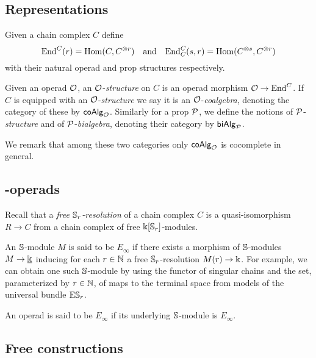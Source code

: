 \subsection{Representations}

Given a chain complex $C$ define
\[
\End^C(r) = \Hom(C, C^{\otimes r})
\quad \text{and} \quad
\End^C_C(s, r) = \Hom(C^{\otimes s}, C^{\otimes r})
\]
with their natural operad and prop structures respectively.

Given an operad $\cO$, an $\cO$-\textit{structure} on $C$ is an operad morphism $\cO \to \End^C$.
If $C$ is equipped with an $\cO$-\textit{structure} we say it is an $\cO$-\textit{coalgebra}, denoting the category of these by $\coAlg_\cO$.
Similarly for a prop $\cP$, we define the notions of $\cP$-\textit{structure} and of $\cP$-\textit{bialgebra}, denoting their category by $\biAlg_\cP$.

We remark that among these two categories only $\coAlg_\cO$ is cocomplete in general.

\subsection{\pdfEinfty-operads}

Recall that a \textit{free $\S_r$-resolution} of a chain complex $C$ is a quasi-isomorphism $R \to C$ from a chain complex of free $\k[\S_r]$-modules.

An $\S$-module $M$ is said to be $E_{\infty}$ if there exists a morphism of $\S$-modules $M \to \underline{\k}$ inducing for each $r \in \N$ a free $\S_r$-resolution $M(r) \to \k$.
For example, we can obtain one such $\S$-module by using the functor of singular chains and the set, parameterized by $r \in \N$, of maps to the terminal space from models of the universal bundle $\mathrm{E} \S_r$.

An operad is said to be $E_{\infty}$ if its underlying $\S$-module is $E_\infty$.

\subsection{Free constructions} \label{ss:free constructions}


